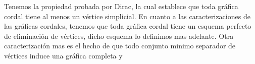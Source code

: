 Tenemos la propiedad probada por Dirac, la cual establece que toda gráfica cordal tiene al menos un vértice simplicial. En cuanto a las caracterizaciones de las gráficas cordales, tenemos que toda gráfica cordal tiene un esquema perfecto de eliminación de vértices, dicho esquema lo definimos mas adelante. Otra caracterización mas es el hecho de que todo conjunto minimo separador de vértices induce una gráfica completa y 

